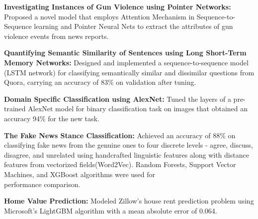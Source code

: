 \begin{cventries}
\vspace{-5mm}
  \cventry
    {}
    {}
    {}
    {}
    {
      \begin{cvitems}
      \item {{ \textbf{Investigating Instances of Gun Violence using Pointer Networks:} Proposed a novel model that employs Attention Mechanism in Sequence-to-Sequence learning and Pointer Neural Nets to extract the attributes of gun violence events from news reports.}}
      \item {{ \textbf{Quantifying Semantic Similarity of Sentences using Long Short-Term Memory Networks:} Designed and implemented a sequence-to-sequence model (LSTM network) for classifying semantically similar and dissimilar questions from Quora, carrying an accuracy of 83\% on validation after tuning.}}
      \item {{\textbf{Domain Specific Classification using AlexNet:} Tuned the layers of a pre-trained AlexNet model for binary classification task on images that obtained an accuracy 94\% for the new task.}}
      \item { \textbf{The Fake News Stance Classification:} Achieved an accuracy of 88\% on classifying fake news from the genuine ones to four discrete levels - agree, discuss, disagree, and unrelated using handcrafted linguistic features along with distance features from vectorized fields(Word2Vec). Random Forests, Support Vector Machines, and XGBoost algorithms were used for \\ performance comparison.}
      \item { \textbf{Home Value Prediction:} Modeled Zillow's house rent prediction problem using Microsoft's LightGBM algorithm with a mean absolute error of 0.064.}
      \end{cvitems}
    }
\end{cventries}

